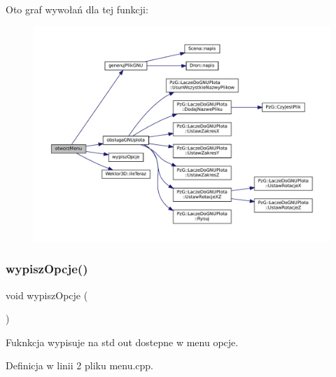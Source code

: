 Oto graf wywołań dla tej funkcji\+:\nopagebreak
\begin{figure}[H]
\begin{center}
\leavevmode
\includegraphics[width=350pt]{menu_8hh_a32a0a14b80567d267e3e6d831c2a517b_cgraph}
\end{center}
\end{figure}
\mbox{\label{menu_8hh_a94d72e7cfca9043780b1dda5a01e9632}} 
\subsubsection{\texorpdfstring{wypiszOpcje()}{wypiszOpcje()}}
{\footnotesize\ttfamily void wypisz\+Opcje (\begin{DoxyParamCaption}{ }\end{DoxyParamCaption})}

Fuknkcja wypisuje na std out dostepne w menu opcje. 

Definicja w linii 2 pliku menu.\+cpp.

